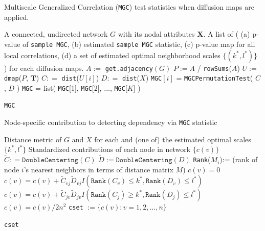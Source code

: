 \documentclass[12pt]{article}
\theoremstyle{definition}
\begin{document}
\begin{algorithm}[H]
	\caption{Multiscale Generalized Correlation (\texttt{MGC}) test statistics when diffusion maps are applied.}
	\begin{algorithmic}[1]
		\Require A connected, undirected network $G$ with its nodal attributes $\mathbf{X}$.
		\Ensure A list of \big(  (a) p-value of \texttt{sample MGC}, (b) estimated \texttt{sample MGC} statistic, (c) p-value map for all local correlations, (d) a set of estimated optimal neighborhood scales $\{  (k^{*}, l^{*}  ) \}$  \big) for each diffusion maps.
		\State $A :=$ \texttt{get.adjacency}$(G)$
		\State $P := A $ / \texttt{rowSums}($A$) 
		\State $U :=$ \texttt{dmap}($P$, $\mathbf{T}$) 
		\Begin
		\State $C : =$  \texttt{dist}($U[i]$) 
		\State $D : =$ \texttt{dist}($X$) 
		\State \texttt{MGC}$[i]$ = \texttt{MGCPermutationTest}( $C$, $D$ ) 
		\End
		\EndFor
		\State \texttt{MGC} = list( \texttt{MGC}[1], \texttt{MGC}[2], $\ldots$, \texttt{MGC}[$K$]  )
		
		\Return \texttt{MGC}
		\EndFunction
	\end{algorithmic}
\end{algorithm}



\begin{algorithm}[H]
	\caption{Node-specific contribution to detecting dependency via \texttt{MGC} statistic}
	\begin{algorithmic}[1]
		\Require Distance metric of $G$ and $X$ for each and (one of) the estimated optimal scales $\{ k^{*}, l^{*} \}$ 
		\Ensure  Standardized contributions of each node in network $\{  c(v) \}$
		\State $\tilde{C} : = \texttt{DoubleCentering}(C)$
		\State $\tilde{D} := \texttt{DoubleCentering}(D)$
		\State \texttt{Rank}($M_{i}$):= (rank of node $i$'s nearest neighbors in terms of distance matrix $M$)
		\State $c(v) = 0$
		\Begin
		\State $c(v) =  c(v) + \tilde{C}_{vj} \tilde{D}_{v j} I(  \texttt{Rank}(C_{v})  \leq k^{*}, \texttt{Rank}(D_{v}) \leq l^{*} )$
		\State  $c(v) = c(v) + \tilde{C}_{jv} \tilde{D}_{jv} I(  \texttt{Rank}(C_{j}) \geq k^{*}, \texttt{Rank}(D_{j}) \leq l^{*} )$
		\End
		\EndFor
		\State $c(v) = c(v) / 2 n^2$
		\EndFor
		\State \texttt{cset} $:= \{ c(v) : v = 1,2, \ldots ,n  \}$
		
		\Return  \texttt{cset}
		\EndFunction
	\end{algorithmic}
\end{algorithm}
\end{document}
